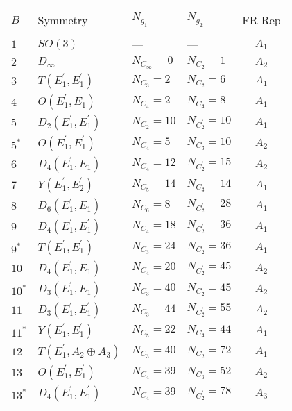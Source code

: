 \documentclass[a4paper,12pt]{article}
\begin{document}
\begin{table}[!htb]
\begin{center}
\begin{tabular}
{|l|l|l|l|c|}
\hline
& & & & \\
$B$ & Symmetry & $N_{g_1}$ & $N_{g_2}$ & FR-Rep \\
& & & & \\
\hline
$1$ & $SO(3)$ & --- & --- & $A_1$ \\
\hline
$2$& $D_\infty$ & $N_{C_\infty} = 0$ & $N_{C_2} = 1$
& $A_2$ \\
\hline
$3$ & $T(E_1^\prime,E_1^\prime)$ & $N_{C_3} = 2$ 
& $N_{C_2} = 6$ & $A_1$ \\
\hline
$4$ & $O(E_1^\prime,E_1)$ & $N_{C_4} = 2$ 
& $N_{C_3} = 8$ & $A_1$ \\
\hline
$5$ & $D_2(E_1^\prime,E_1^\prime)$ 
& $N_{C_2} = 10$ & $N_{C_2^\prime} = 10$  & $A_1$ \\
$5^*$ & $O(E_1^\prime,E_1^\prime)$ & $N_{C_4} = 5$ & $N_{C_3} =10$ & $A_2$ \\
\hline
$6$ & $D_4(E_1^\prime,E_1)$ & $N_{C_4} = 12$ & 
$N_{C_2^\prime} = 15$ & $A_2$ \\
\hline
$7$ & $Y(E_1^\prime,E_2^\prime)$ & $N_{C_5} = 14$ & $N_{C_3} =14$ & $A_1$ 
\\
\hline
$8$ & $D_6(E_1^\prime, E_1) $ & $N_{C_6} = 8$ 
& $N_{C_2^\prime} = 28$ & $A_1$ \\
\hline
$9$ & $D_4(E_1^\prime, E_1^\prime)$ & $N_{C_4} = 18$ 
& $N_{C_2^\prime}= 36$ & $A_1$ \\
$9^*$ & $T(E_1^\prime,E_1^\prime)$ & $N_{C_3} = 24$ &
$N_{C_2} = 36$ & $A_1$ \\
\hline
$10$ & $D_4(E_1^\prime, E_1)$  & $N_{C_4} = 20$ & 
$N_{C_2^\prime} = 45$ & $A_2$ \\
$10^*$ & $D_3(E_1^\prime, E_1)$ & $N_{C_3} = 40$ & $N_{C_2} = 45$ & $A_2$ \\
\hline
$11$ & $D_3(E_1^\prime,E_1^\prime)$  & $N_{C_3} = 44$ 
& $N_{C_2^\prime} = 55$ & $A_2$ \\
$11^*$ & $Y(E_1^\prime, E_1^\prime)$ & $N_{C_5} = 22$ & $N_{C_3} = 44$ & 
$A_1$ \\
\hline
$12$ & $T(E_1^\prime,A_2\oplus A_3)$  &$N_{C_3} =40$ & $N_{C_2} = 72$ & $A_1$ \\
\hline
$13$ & $O(E_1^\prime,E_1^\prime)$  & $N_{C_4} = 39$ & $N_{C_3}= 52$ & $A_2$ \\
$13^*$ & $D_4(E_1^\prime, E_1^\prime)$ & $N_{C_4} = 39$ 
& $N_{C_2^\prime} = 78$ & $A_3$  
\\

\end{tabular}
\end{center}
\end{table}
\end{document}
